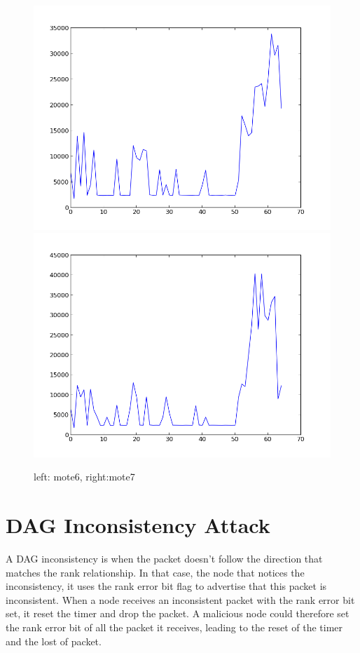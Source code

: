 \documentclass{report}
\begin{document}
\begin{figure}[ht!]
\centering
\includegraphics[scale=0.35]{img/mote6}
\includegraphics[scale=0.35]{img/mote7}
\caption{left: mote6, right:mote7}
\end{figure}





\section{DAG Inconsistency Attack}
A DAG inconsistency is when the packet doesn't follow the direction that matches the rank relationship. In that case, the node that notices the inconsistency, it uses the rank error bit flag to advertise that this packet is inconsistent. When a node receives an inconsistent packet with the rank error bit set, it reset the timer and drop the packet. A malicious node could therefore set the rank error bit of all the packet it receives, leading to the reset of the timer and the lost of packet.\\
\end{document}
